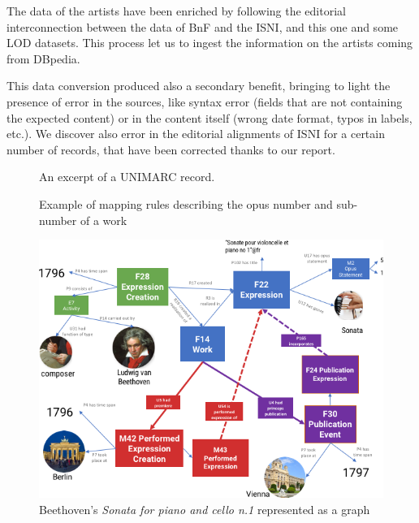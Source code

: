 \documentclass[a4paper,11pt]{report}
\begin{document}
The data of the artists have been enriched by following the editorial interconnection between the data of BnF and the ISNI, and this one and some LOD datasets. This process let us to ingest the information on the artists coming from DBpedia.

This data conversion produced also a secondary benefit, bringing to light the presence of error in the sources, like syntax error (fields that are not containing the expected content) or in the content itself (wrong date format, typos in labels, etc.). We discover also error in the editorial alignments of ISNI for a certain number of records, that have been corrected thanks to our report.

\begin{figure}
 \centerline{}
  \caption{An excerpt of a UNIMARC record.}
 \label{fig:unimarc}
 \smallskip
 \centerline{}
  \caption{Example of mapping rules describing the opus number and sub-number of a work}
 \label{fig:mappings}
\end{figure}

\begin{figure}
 \centerline{
 \includegraphics[width=\columnwidth]{schema.png}}
 \caption{Beethoven's \textit{Sonata for piano and cello n.1} represented as a graph}
 \label{fig:schema}
\end{figure}
\end{document}
